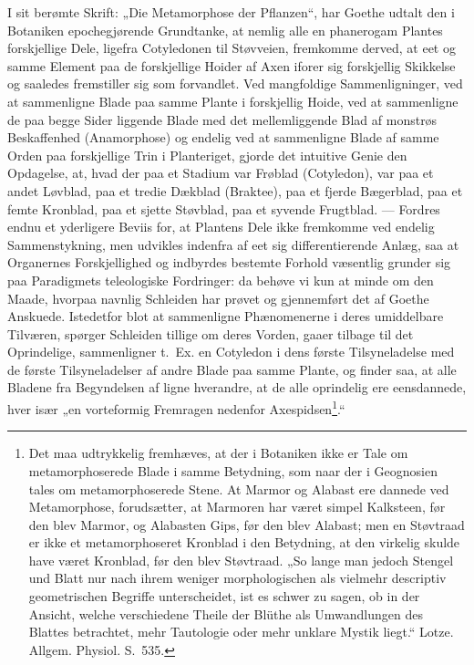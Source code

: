 \documentclass[11pt]{book}
\newcommand{\opage}[1]{\marginnote{\footnotesize\textit{[#1]}}}
\begin{document}
I sit berømte Skrift: „Die Metamorphose der Pflanzen“, har Goethe udtalt den
i Botaniken epochegjørende Grundtanke, at nemlig alle en phanerogam Plantes
forskjellige Dele, ligefra Cotyledonen til Støvveien, fremkomme derved, at
eet og samme Element paa de forskjellige Hoider af Axen iforer sig
forskjellig Skikkelse og saaledes fremstiller sig som forvandlet.
Ved mangfoldige Sammenligninger, ved at sammenligne Blade paa samme Plante i
forskjellig Hoide, ved at sammenligne de paa begge Sider liggende Blade med
det mellemliggende Blad af monstrøs Beskaffenhed (Anamorphose) og endelig
ved at sammenligne Blade af samme Orden paa forskjellige Trin i Planteriget,
gjorde det intuitive Genie den Opdagelse, at, hvad der paa et Stadium var
Frøblad (Cotyledon), var paa et andet Løvblad, paa et tredie Dækblad
(Braktee), paa et fjerde Bægerblad, paa et femte Kronblad, paa et sjette
Støvblad, paa et syvende Frugtblad. --- Fordres endnu et yderligere Beviis
for, at Plantens Dele ikke fremkomme ved endelig
\opage{305} \setcounter{footnote}{0}%
Sammenstykning, men udvikles indenfra af eet sig differentierende Anlæg, saa
at Organernes Forskjellighed og indbyrdes bestemte Forhold væsentlig grunder
sig paa Paradigmets teleologiske Fordringer: da behøve vi kun at minde om
den Maade, hvorpaa navnlig Schleiden har prøvet og gjennemført det af Goethe
Anskuede. Istedetfor blot at sammenligne Phænomenerne i deres umiddelbare
Tilværen, spørger Schleiden tillige om deres Vorden, gaaer tilbage til det
Oprindelige, sammenligner t.~Ex. en Cotyledon i dens første Tilsyneladelse
med de første Tilsyneladelser af andre Blade paa samme Plante, og finder
saa, at alle Bladene fra Begyndelsen af ligne hverandre, at de alle
oprindelig ere eensdannede, hver især „en vorteformig Fremragen nedenfor
Axespidsen\footnote{Det maa udtrykkelig fremhæves, at der i Botaniken ikke
er Tale om metamorphoserede Blade i samme Betydning, som naar der i
Geognosien tales om metamorphoserede Stene. At Marmor og Alabast ere dannede
ved Metamorphose, forudsætter, at Marmoren har været simpel Kalksteen, før
den blev Marmor, og Alabasten Gips, før den blev Alabast; men en Støvtraad
er ikke et metamorphoseret Kronblad i den Betydning, at den virkelig skulde
have været Kronblad, før den blev Støvtraad. „So lange man jedoch Stengel
und Blatt nur nach ihrem weniger morphologischen als vielmehr descriptiv
geometrischen Begriffe unterscheidet, ist es schwer zu sagen, ob in der
Ansicht, welche verschiedene Theile der Blüthe als Umwandlungen des Blattes
betrachtet, mehr Tautologie oder mehr unklare Mystik liegt.“ Lotze. Allgem.
Physiol. S.~535.}.“
\end{document}
